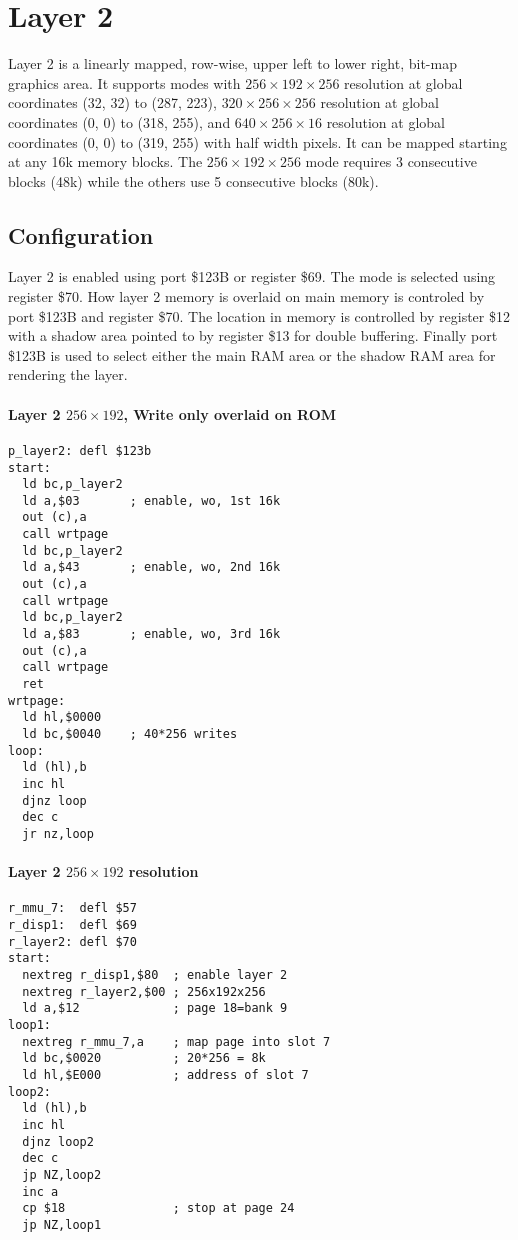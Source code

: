 \section{Layer 2}
Layer 2 is a linearly mapped, row-wise, upper left to lower right,
bit-map graphics area.  It supports modes with $256\times192\times256$
resolution at global coordinates (32, 32) to (287, 223),
$320\times256\times256$ resolution at global coordinates (0, 0) to
(318, 255), and $640\times256\times16$ resolution at global
coordinates (0, 0) to (319, 255) with half width pixels. It can be
mapped starting at any 16k memory blocks. The $256\times192\times256$
mode requires 3 consecutive blocks (48k) while the others use 5
consecutive blocks (80k).

\subsection{Configuration}
Layer 2 is enabled using port \$123B or register \$69. The mode is
selected using register \$70. How layer 2 memory is overlaid on main
memory is controled by port \$123B and register \$70. The location in
memory is controlled by register \$12 with a shadow area pointed to by
register \$13 for double buffering. Finally port \$123B is used to
select either the main RAM area or the shadow RAM area for rendering
the layer.







\paragraph{Layer 2 $256\times192$, Write only overlaid on ROM}
\begin{verbatim}
p_layer2: defl $123b
start:
  ld bc,p_layer2
  ld a,$03       ; enable, wo, 1st 16k
  out (c),a
  call wrtpage
  ld bc,p_layer2
  ld a,$43       ; enable, wo, 2nd 16k
  out (c),a
  call wrtpage
  ld bc,p_layer2
  ld a,$83       ; enable, wo, 3rd 16k
  out (c),a
  call wrtpage
  ret
wrtpage:  
  ld hl,$0000
  ld bc,$0040    ; 40*256 writes
loop:
  ld (hl),b
  inc hl
  djnz loop
  dec c
  jr nz,loop
\end{verbatim}

\paragraph{Layer 2 $256\times192$ resolution}
\begin{verbatim}
r_mmu_7:  defl $57
r_disp1:  defl $69
r_layer2: defl $70
start:
  nextreg r_disp1,$80  ; enable layer 2
  nextreg r_layer2,$00 ; 256x192x256
  ld a,$12             ; page 18=bank 9
loop1:
  nextreg r_mmu_7,a    ; map page into slot 7
  ld bc,$0020          ; 20*256 = 8k
  ld hl,$E000          ; address of slot 7
loop2:
  ld (hl),b
  inc hl
  djnz loop2
  dec c
  jp NZ,loop2
  inc a
  cp $18               ; stop at page 24
  jp NZ,loop1
\end{verbatim}

